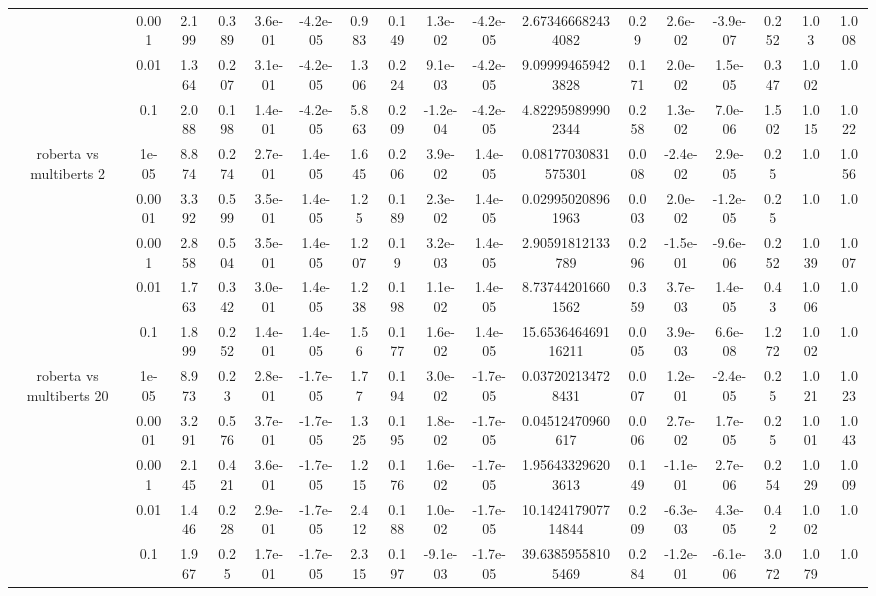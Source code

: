 \begin{tabular}{|c|c|c|c|c|c|c|c|c|c|c|c|c|c|c|c|c|}
 & 0.001 & 2.199 & 0.389 & 3.6e-01 & -4.2e-05 & 0.983 & 0.149 & 1.3e-02 & -4.2e-05 & 2.673466682434082 & 0.29 & 2.6e-02 & -3.9e-07 & 0.252 & 1.03 & 1.008 \\
 & 0.01 & 1.364 & 0.207 & 3.1e-01 & -4.2e-05 & 1.306 & 0.224 & 9.1e-03 & -4.2e-05 & 9.099994659423828 & 0.171 & 2.0e-02 & 1.5e-05 & 0.347 & 1.002 & 1.0 \\
 & 0.1 & 2.088 & 0.198 & 1.4e-01 & -4.2e-05 & 5.863 & 0.209 & -1.2e-04 & -4.2e-05 & 4.822959899902344 & 0.258 & 1.3e-02 & 7.0e-06 & 1.502 & 1.015 & 1.022 \\
\hline
\multirow{5}{*}{roberta  vs multiberts 2} & 1e-05 & 8.874 & 0.274 & 2.7e-01 & 1.4e-05 & 1.645 & 0.206 & 3.9e-02 & 1.4e-05 & 0.08177030831575301 & 0.008 & -2.4e-02 & 2.9e-05 & 0.25 & 1.0 & 1.056 \\
 & 0.0001 & 3.392 & 0.599 & 3.5e-01 & 1.4e-05 & 1.25 & 0.189 & 2.3e-02 & 1.4e-05 & 0.029950208961963 & 0.003 & 2.0e-02 & -1.2e-05 & 0.25 & 1.0 & 1.0 \\
 & 0.001 & 2.858 & 0.504 & 3.5e-01 & 1.4e-05 & 1.207 & 0.19 & 3.2e-03 & 1.4e-05 & 2.90591812133789 & 0.296 & -1.5e-01 & -9.6e-06 & 0.252 & 1.039 & 1.007 \\
 & 0.01 & 1.763 & 0.342 & 3.0e-01 & 1.4e-05 & 1.238 & 0.198 & 1.1e-02 & 1.4e-05 & 8.737442016601562 & 0.359 & 3.7e-03 & 1.4e-05 & 0.43 & 1.006 & 1.0 \\
 & 0.1 & 1.899 & 0.252 & 1.4e-01 & 1.4e-05 & 1.56 & 0.177 & 1.6e-02 & 1.4e-05 & 15.653646469116211 & 0.005 & 3.9e-03 & 6.6e-08 & 1.272 & 1.002 & 1.0 \\
\hline
\multirow{5}{*}{roberta  vs multiberts 20} & 1e-05 & 8.973 & 0.23 & 2.8e-01 & -1.7e-05 & 1.77 & 0.194 & 3.0e-02 & -1.7e-05 & 0.037202134728431 & 0.007 & 1.2e-01 & -2.4e-05 & 0.25 & 1.021 & 1.023 \\
 & 0.0001 & 3.291 & 0.576 & 3.7e-01 & -1.7e-05 & 1.325 & 0.195 & 1.8e-02 & -1.7e-05 & 0.04512470960617 & 0.006 & 2.7e-02 & 1.7e-05 & 0.25 & 1.001 & 1.043 \\
 & 0.001 & 2.145 & 0.421 & 3.6e-01 & -1.7e-05 & 1.215 & 0.176 & 1.6e-02 & -1.7e-05 & 1.956433296203613 & 0.149 & -1.1e-01 & 2.7e-06 & 0.254 & 1.029 & 1.009 \\
 & 0.01 & 1.446 & 0.228 & 2.9e-01 & -1.7e-05 & 2.412 & 0.188 & 1.0e-02 & -1.7e-05 & 10.142417907714844 & 0.209 & -6.3e-03 & 4.3e-05 & 0.42 & 1.002 & 1.0 \\
 & 0.1 & 1.967 & 0.25 & 1.7e-01 & -1.7e-05 & 2.315 & 0.197 & -9.1e-03 & -1.7e-05 & 39.63859558105469 & 0.284 & -1.2e-01 & -6.1e-06 & 3.072 & 1.079 & 1.0 \\

\end{tabular}
